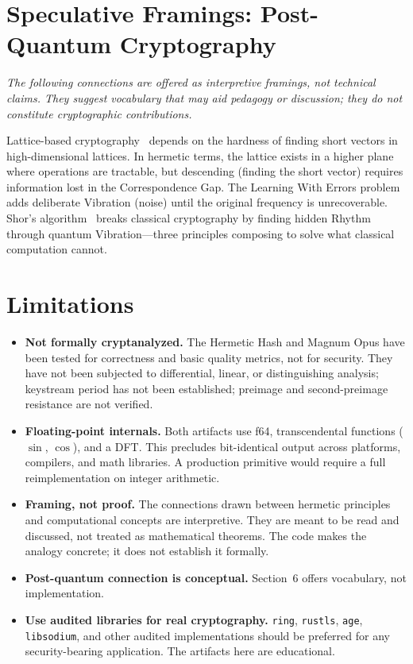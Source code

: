 \documentclass[sigplan,anonymous=false]{acmart}
\begin{document}
\section{Speculative Framings: Post-Quantum Cryptography}

\emph{The following connections are offered as interpretive framings, not technical claims. They suggest vocabulary that may aid pedagogy or discussion; they do not constitute cryptographic contributions.}

\medskip

Lattice-based cryptography~\cite{regev} depends on the hardness of finding short vectors in high-dimensional lattices. In hermetic terms, the lattice exists in a higher plane where operations are tractable, but descending (finding the short vector) requires information lost in the Correspondence Gap. The Learning With Errors problem~\cite{regev} adds deliberate Vibration (noise) until the original frequency is unrecoverable. Shor's algorithm~\cite{shor} breaks classical cryptography by finding hidden Rhythm through quantum Vibration---three principles composing to solve what classical computation cannot.

\section{Limitations}
\label{sec:limitations}

\begin{itemize}[nosep]
  \item \textbf{Not formally cryptanalyzed.} The Hermetic Hash and Magnum Opus have been tested for correctness and basic quality metrics, not for security. They have not been subjected to differential, linear, or distinguishing analysis; keystream period has not been established; preimage and second-preimage resistance are not verified.
  \item \textbf{Floating-point internals.} Both artifacts use f64, transcendental functions ($\sin$, $\cos$), and a DFT. This precludes bit-identical output across platforms, compilers, and math libraries. A production primitive would require a full reimplementation on integer arithmetic.
  \item \textbf{Framing, not proof.} The connections drawn between hermetic principles and computational concepts are interpretive. They are meant to be read and discussed, not treated as mathematical theorems. The code makes the analogy concrete; it does not establish it formally.
  \item \textbf{Post-quantum connection is conceptual.} Section~6 offers vocabulary, not implementation.
  \item \textbf{Use audited libraries for real cryptography.} \texttt{ring}, \texttt{rustls}, \texttt{age}, \texttt{libsodium}, and other audited implementations should be preferred for any security-bearing application. The artifacts here are educational.
\end{itemize}
\end{document}
